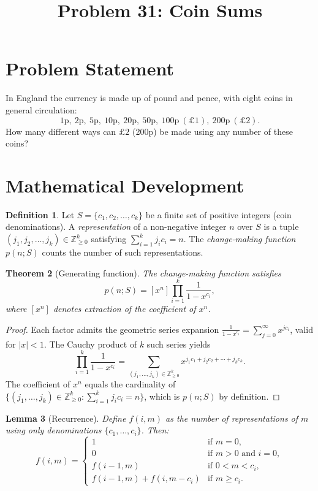 \documentclass[12pt]{article}
\title{Problem 31: Coin Sums}
\author{}
\date{}
\newtheorem{theorem}{Theorem}
\newtheorem{lemma}[theorem]{Lemma}
\theoremstyle{definition}
\newtheorem{definition}[theorem]{Definition}
\begin{document}
\maketitle

\section{Problem Statement}
In England the currency is made up of pound and pence, with eight coins in general circulation:
\[
1\text{p},\ 2\text{p},\ 5\text{p},\ 10\text{p},\ 20\text{p},\ 50\text{p},\ 100\text{p}\ (\pounds 1),\ 200\text{p}\ (\pounds 2).
\]
How many different ways can $\pounds 2$ (200p) be made using any number of these coins?

\section{Mathematical Development}

\begin{definition}
Let $S = \{c_1, c_2, \ldots, c_k\}$ be a finite set of positive integers (coin denominations). A \emph{representation} of a non-negative integer $n$ over $S$ is a tuple $(j_1, j_2, \ldots, j_k) \in \mathbb{Z}_{\ge 0}^k$ satisfying $\sum_{i=1}^{k} j_i c_i = n$. The \emph{change-making function} $p(n; S)$ counts the number of such representations.
\end{definition}

\begin{theorem}[Generating function]
The change-making function satisfies
\[
p(n; S) = [x^n] \prod_{i=1}^{k} \frac{1}{1 - x^{c_i}},
\]
where $[x^n]$ denotes extraction of the coefficient of $x^n$.
\end{theorem}

\begin{proof}
Each factor admits the geometric series expansion $\frac{1}{1 - x^{c_i}} = \sum_{j=0}^{\infty} x^{j c_i}$, valid for $|x| < 1$. The Cauchy product of $k$ such series yields
\[
\prod_{i=1}^{k} \frac{1}{1 - x^{c_i}} = \sum_{(j_1, \ldots, j_k) \in \mathbb{Z}_{\ge 0}^k} x^{j_1 c_1 + j_2 c_2 + \cdots + j_k c_k}.
\]
The coefficient of $x^n$ equals the cardinality of $\{(j_1, \ldots, j_k) \in \mathbb{Z}_{\ge 0}^k : \sum_{i=1}^{k} j_i c_i = n\}$, which is $p(n; S)$ by definition.
\end{proof}

\begin{lemma}[Recurrence]
Define $f(i, m)$ as the number of representations of $m$ using only denominations $\{c_1, \ldots, c_i\}$. Then:
\[
f(i, m) = \begin{cases}
1 & \text{if } m = 0, \\
0 & \text{if } m > 0 \text{ and } i = 0, \\
f(i-1, m) & \text{if } 0 < m < c_i, \\
f(i-1, m) + f(i, m - c_i) & \text{if } m \ge c_i.
\end{cases}
\]
\end{lemma}
\end{document}
